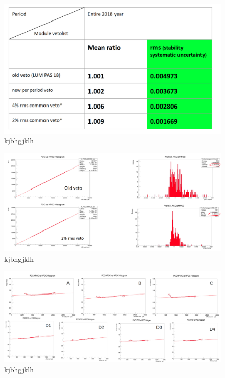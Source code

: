 \begin{figure}[!htp]
\centering
\includegraphics[width=1\textwidth]{ashish_thesis/stability_unc_diff_veto.png}
\caption{%
kjbhgjklh
}
\label{fig:stabilityuncallveto}
\end{figure}


\begin{figure}[!htp]
\centering
\includegraphics[width=1\textwidth]{ashish_thesis/pcc_hfoc_linearity_sys_unc.png}
\caption{%
kjbhgjklh
}
\label{fig:linearitypcchfoc}
\end{figure}

\begin{figure}[!htp]
\centering
\includegraphics[width=1\textwidth]{ashish_thesis/pcc_hfoc_new_veto_linearity.png}
\caption{%
kjbhgjklh
}
\label{fig:linearitypcchfoc}
\end{figure}

